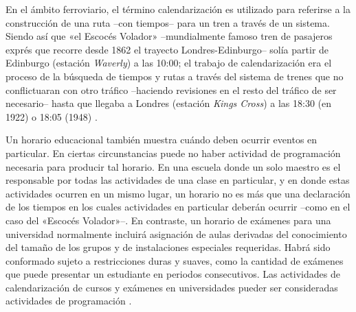 \documentclass[draft,12pt,headsepline,footsepline,paper=letter]{scrreprt}
\begin{document}
En el ámbito ferroviario, el término calendarización es utilizado para referirse a la construcción de una ruta –con tiempos– para un tren a través de un sistema. Siendo así que «el Escocés Volador» –mundialmente famoso tren de pasajeros exprés que recorre desde 1862 el trayecto Londres-Edinburgo– solía partir de Edinburgo (estación \textit{Waverly}) a las 10:00; el trabajo de calendarización era el proceso de la búsqueda de tiempos y rutas a través del sistema de trenes que no conflictuaran con otro tráfico –haciendo revisiones en el resto del tráfico de ser necesario– hasta que llegaba a Londres (estación \textit{Kings Cross}) a las 18:30 (en 1922) o 18:05 (1948) \citep[p.~48, 49]{wren95scheduling-timetabling}.

Un horario educacional también muestra cuándo deben ocurrir eventos en particular. En ciertas circunstancias puede no haber actividad de programación necesaria para producir tal horario. En una escuela donde un solo maestro es el responsable por todas las actividades de una clase en particular, y en donde estas actividades ocurren en un mismo lugar, un horario no es más que una declaración de los tiempos en los cuales actividades en particular deberán ocurrir –como en el caso del «Escocés Volador»–. En contraste, un horario de exámenes para una universidad normalmente incluirá asignación de aulas derivadas del conocimiento del tamaño de los grupos y de instalaciones especiales requeridas. Habrá sido conformado sujeto a restricciones duras y suaves, como la cantidad de exámenes que puede presentar un estudiante en periodos consecutivos. Las actividades de calendarización de cursos y exámenes en universidades pueder ser consideradas actividades de programación \citep[p.~49]{wren95scheduling-timetabling}.
\end{document}
